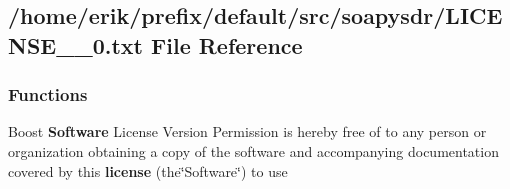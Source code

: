 \subsection{/home/erik/prefix/default/src/soapysdr/\+L\+I\+C\+E\+N\+S\+E\+\_\+\_\+0.txt File Reference}
\label{LICENSE__1__0_8txt}
\subsubsection*{Functions}
\begin{DoxyCompactItemize}
\item 
Boost {\bf Software} License Version Permission is hereby free of to any person or organization obtaining a copy of the software and accompanying documentation covered by this {\bf license} (the\char`\"{}Software\char`\"{}) to use
\end{DoxyCompactItemize}

